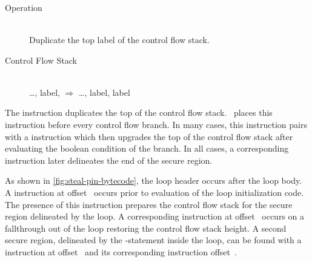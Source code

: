 \subsubsection{\dup}

\begin{samepage}
\begin{description}
  \item[Operation] \hfill \\
    Duplicate the top label of the control flow stack.
  \item[Control Flow Stack] \hfill \\
    \ldots, label, $\Rightarrow$ \ldots, label, label
\end{description}
\end{samepage}

The \dup instruction duplicates the top of the control flow stack.
\JitFlow\ places this instruction before every control flow branch.
In many cases, this instruction pairs with a \join instruction which then upgrades the top of the control flow stack after evaluating the boolean condition of the branch.
In all cases, a corresponding \popj instruction later delineates the end of the secure region.

As shown in \autoref{fig:steal-pin-bytecode}, the loop header occurs after the loop body.
A \dup instruction at offset~ occurs prior to evaluation of the loop initialization code.
The presence of this instruction prepares the control flow stack for the secure region delineated by the loop.
A corresponding \popj instruction at offset~ occurs on a fallthrough out of the loop restoring the control flow stack height.
A second secure region, delineated by the -statement inside the loop, can be found with a \dup instruction at offset~ and its corresponding \popj instruction offset~.


\subsubsection{\join}\label{sec:join-cflabel}

